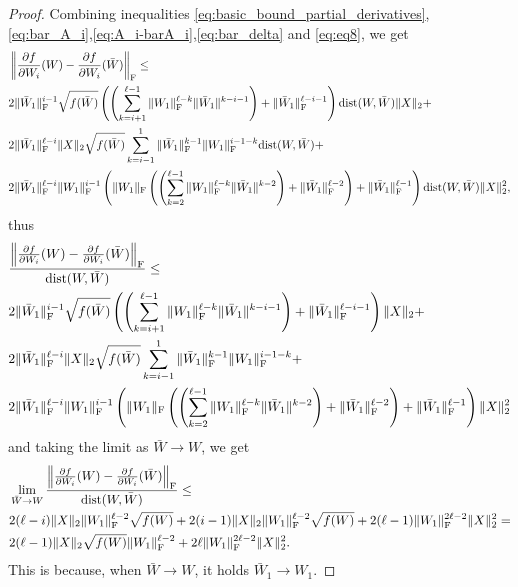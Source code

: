 \documentclass[a4paper,11pt]{article}
\newcommand{\1}{\mathbbm{1}}
\theoremstyle{plain}
\begin{document}
\begin{proof}
Combining inequalities \eqref{eq:basic_bound_partial_derivatives},\eqref{eq:bar_A_i},\eqref{eq:A_i-barA_i},\eqref{eq:bar_delta} and \eqref{eq:eq8},
we get
\begin{align*}
    &\left\|\frac{\partial f}{\partial W_i}(W)-\frac{\partial f}{\partial W_i}(\bar W) \right\|_{\rm F} \leq \\ &  2\|\bar W_1\|_{\rm F}^{i-1} \sqrt{f(\bar W)} \left(\left(\sum_{k=i+1}^{\ell-1} \|W_1\|_{\rm F}^{\ell-k} \|\bar W_1\|^{k-i-1}\right) + \|\bar W_1\|_{\rm F}^{\ell-i-1}\right)  \textnormal{dist}(W,\bar W) \|X\|_2 + \\ & 2 \|\bar W_1\|_{\rm F}^{\ell-i} \|X\|_2 \sqrt{f(\bar W)} \sum_{k=i-1}^1  \|\bar W_1\|_{\rm F}^{k-1} \| W_1 \|_{\rm F}^{i-1-k} \textnormal{dist}(W,\bar W) + \\ & 2\|\bar W_1\|_{\rm F}^{\ell-i} \|W_1\|_{\rm F}^{i-1} \left(\|W_1\|_{\rm F} \left(\left(\sum_{k=2}^{\ell-1} \|W_1\|_{\rm F}^{\ell-k} \|\bar W_1\|^{k-2}\right) + \|\bar W_1\|_{\rm F}^{\ell-2} \right) + \|\bar W_1\|_{\rm F}^{\ell-1} \right) \textnormal{dist}(W,\bar W) \|X\|^2_2,  
\end{align*}
thus
\begin{align*}
    &\frac{\left\|\frac{\partial f}{\partial W_i}(W)-\frac{\partial f}{\partial W_i}(\bar W) \right\|_{\rm F}}{\textnormal{dist}(W,\bar W)} \leq \\ &  2\|\bar W_1\|_{\rm F}^{i-1} \sqrt{f(\bar W)} \left(\left(\sum_{k=i+1}^{\ell-1} \|W_1\|_{\rm F}^{\ell-k} \|\bar W_1\|^{k-i-1}\right) + \|\bar W_1\|_{\rm F}^{\ell-i-1}\right) \|X\|_2 + \\ & 2 \|\bar W_1\|_{\rm F}^{\ell-i} \|X\|_2 \sqrt{f(\bar W)} \sum_{k=i-1}^1  \|\bar W_1\|_{\rm F}^{k-1} \| W_1 \|_{\rm F}^{i-1-k} + \\ & 2 \|\bar W_1\|_{\rm F}^{\ell-i} \|W_1\|_{\rm F}^{i-1} \left(\|W_1\|_{\rm F} \left(\left(\sum_{k=2}^{\ell-1} \|W_1\|_{\rm F}^{\ell-k} \|\bar W_1\|^{k-2}\right) + \|\bar W_1\|_{\rm F}^{\ell-2} \right) + \|\bar W_1\|_{\rm F}^{\ell-1} \right) \|X\|^2_2
\end{align*}
and taking the limit as $\bar W \longrightarrow W$, we get
\begin{align*}
    &\lim_{\bar W \rightarrow W}\frac{\left\|\frac{\partial f}{\partial W_i}(W)-\frac{\partial f}{\partial W_i}(\bar W) \right\|_{\rm F}}{\textnormal{dist}(W,\bar W)} \leq \\ &  2 (\ell-i) \|X\|_2 \|W_1\|_{\rm F}^{\ell-2} \sqrt{f(W)}  +2 (i-1) \|X\|_2 \|W_1\|_{\rm F}^{\ell-2} \sqrt{f(W)} + 2 (\ell-1) \|W_1\|_{\rm F}^{2 \ell-2} \|X\|_2^2 = \\ & 2 (\ell-1) \|X\|_2 \sqrt{f(W)} \|W_1\|_{\rm F}^{\ell-2} + 2 \ell \|W_1\|_{\rm F}^{2 \ell-2} \|X\|_2^2.
\end{align*}
This is because, when $\bar W \longrightarrow W$, it holds $\bar W_1\longrightarrow W_1$.


\end{proof}
\end{document}

